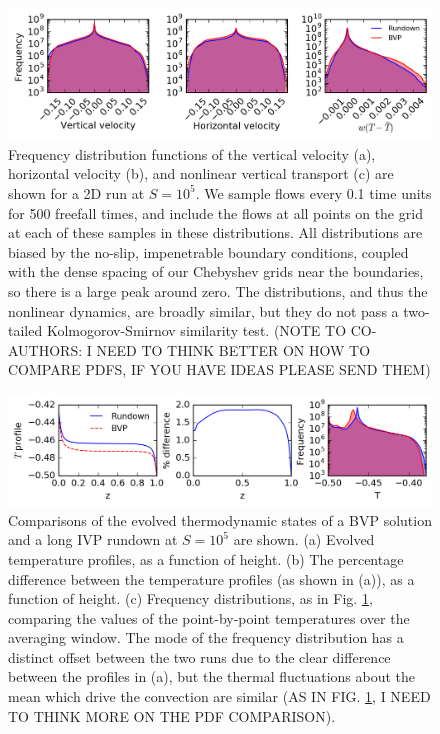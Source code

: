 \documentclass[aps, pre, onecolumn, nofootinbib, notitlepage, groupedaddress, amsfonts, amssymb, amsmath, longbibliography]{revtex4-1}
\begin{document}
\begin{figure}[t]
\includegraphics[width=\textwidth]{./figs/pdf_comparison.png}
\caption{Frequency distribution functions of the vertical velocity (a), horizontal velocity (b), and nonlinear
vertical transport (c) are shown for a 2D run at $S = 10^5$.  We sample flows every 0.1 time units for 500 freefall
times, and include the flows at all points on the grid at each of these samples in these distributions.  All
distributions are biased by the no-slip, impenetrable boundary conditions, coupled with the dense spacing of our
Chebyshev grids near the boundaries, so there is a large peak around zero. The distributions, and thus the nonlinear
dynamics, are broadly similar, but they do not pass a two-tailed Kolmogorov-Smirnov similarity test. (NOTE TO
CO-AUTHORS: I NEED TO THINK BETTER ON HOW TO COMPARE PDFS, IF YOU HAVE IDEAS PLEASE SEND THEM)
\label{fig:pdf_comparison} }
\end{figure}

\begin{figure}[t]
\includegraphics[width=\textwidth]{./figs/temp_comparison.png}
\caption{Comparisons of the evolved thermodynamic states of a BVP solution and a long IVP rundown at
$S = 10^5$ are shown.  (a) Evolved temperature profiles, as a function of height.
(b) The percentage difference between the temperature profiles (as shown in (a)), as a function of height.
(c) Frequency distributions, as in Fig. \ref{fig:pdf_comparison},
comparing the values of the point-by-point temperatures over the averaging
window. The mode of the frequency distribution has a distinct offset between the two runs due to
the clear difference between the profiles in (a), but the
thermal fluctuations about the mean which drive the convection are similar (AS IN FIG. \ref{fig:pdf_comparison},
I NEED TO THINK MORE ON THE PDF COMPARISON).
\label{fig:temp_comparison} }
\end{figure}
\end{document}

